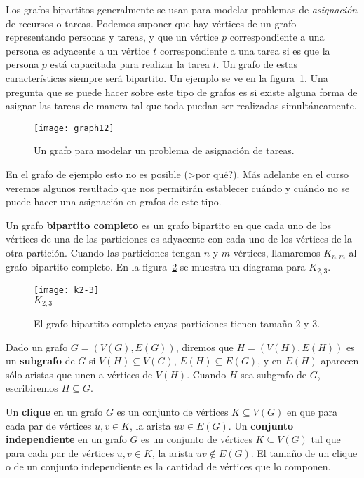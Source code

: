 \begin{ejemplo}
Los grafos bipartitos generalmente se usan para modelar problemas de \emph{asignación} de recursos o tareas.
Podemos suponer que hay vértices de un grafo representando personas y tareas, y que un vértice $p$ correspondiente a una persona es adyacente a un vértice $t$ correspondiente a una tarea si es que la persona $p$ está capacitada para realizar la tarea $t$.
Un grafo de estas características siempre será bipartito.
Un ejemplo se ve en la figura~\ref{fig:job-ass}.
Una pregunta que se puede hacer sobre este tipo de grafos es si existe alguna forma de asignar las tareas de manera tal que toda puedan ser realizadas simultáneamente.
\begin{figure}[h!]
\centering
\texttt{[image: graph12]}
\caption{Un grafo para modelar un problema de asignación de tareas.}
\label{fig:job-ass}
\end{figure} 
En el grafo de ejemplo esto no es posible (>por qué?).
Más adelante en el curso veremos algunos resultado que nos permitirán establecer cuándo y cuándo no se puede hacer una asignación en grafos de este tipo.
\end{ejemplo}

\begin{definicion}
Un grafo {\bf bipartito completo} es un grafo bipartito en que cada uno de los vértices de una de las particiones es adyacente con cada uno de los vértices de la otra partición.
Cuando las particiones tengan $n$ y $m$ vértices, llamaremos $K_{n,m}$ al grafo bipartito completo.
En la figura~\ref{fig:k2-3} se muestra un diagrama para $K_{2,3}$.
\begin{figure}[h!]
\centering
\texttt{[image: k2-3]}\\
$K_{2,3}$
\caption{El grafo bipartito completo cuyas particiones tienen tamaño 2 y 3.}
\label{fig:k2-3}
\end{figure}
\end{definicion}

\begin{definicion}
Dado un grafo $G=(V(G),E(G))$, diremos que $H=(V(H),E(H))$ es un {\bf subgrafo} de $G$ si $V(H)\subseteq V(G)$, $E(H)\subseteq E(G)$, y en $E(H)$ aparecen sólo aristas que unen a vértices de $V(H)$.
Cuando $H$ sea subgrafo de $G$, escribiremos $H\subseteq G$.

Un {\bf clique} en un grafo $G$ es un conjunto de vértices $K\subseteq V(G)$ en que para cada par de vértices $u,v\in K$, la arista $uv\in E(G)$.
Un {\bf conjunto independiente} en un grafo $G$ es un conjunto de vértices $K\subseteq V(G)$ tal que para cada par de vértices $u,v\in K$, la arista $uv\notin E(G)$.
El tamaño de un clique o de un conjunto independiente es la cantidad de vértices que lo componen.
\end{definicion}

